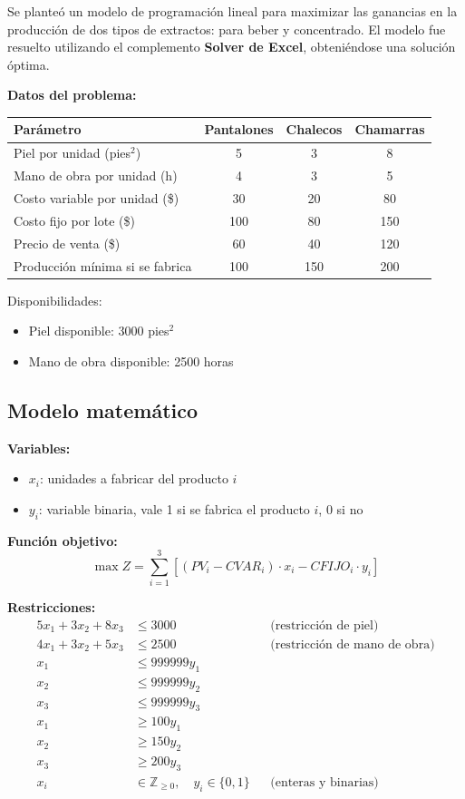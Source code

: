 \documentclass[12pt, a4paper, oneside]{book}
\theoremstyle{definition}
\begin{document}
Se planteó un modelo de programación lineal para maximizar las ganancias en la producción de dos tipos de extractos: para beber y concentrado. El modelo fue resuelto utilizando el complemento \textbf{Solver de Excel}, obteniéndose una solución óptima.

\textbf{Datos del problema:}

\begin{center}
\begin{tabular}{|l|c|c|c|}
\hline
\textbf{Parámetro} & \textbf{Pantalones} & \textbf{Chalecos} & \textbf{Chamarras} \\
\hline
Piel por unidad (pies$^2$) & 5 & 3 & 8 \\
Mano de obra por unidad (h) & 4 & 3 & 5 \\
Costo variable por unidad (\$) & 30 & 20 & 80 \\
Costo fijo por lote (\$) & 100 & 80 & 150 \\
Precio de venta (\$) & 60 & 40 & 120 \\
Producción mínima si se fabrica & 100 & 150 & 200 \\
\hline
\end{tabular}
\end{center}

Disponibilidades:
\begin{itemize}
    \item Piel disponible: 3000 pies$^2$
    \item Mano de obra disponible: 2500 horas
\end{itemize}

\subsection{Modelo matemático}

\textbf{Variables:}
\begin{itemize}
    \item $x_i$: unidades a fabricar del producto $i$
    \item $y_i$: variable binaria, vale 1 si se fabrica el producto $i$, 0 si no
\end{itemize}

\textbf{Función objetivo:}
\[
\max Z = \sum_{i=1}^{3} \left[ (PV_i - CVAR_i)\cdot x_i - CFIJO_i \cdot y_i \right]
\]

\textbf{Restricciones:}
\begin{align*}
5x_1 + 3x_2 + 8x_3 &\leq 3000 && \text{(restricción de piel)} \\
4x_1 + 3x_2 + 5x_3 &\leq 2500 && \text{(restricción de mano de obra)} \\
x_1 &\leq 999999 y_1 \\
x_2 &\leq 999999 y_2 \\
x_3 &\leq 999999 y_3 \\
x_1 &\geq 100 y_1 \\
x_2 &\geq 150 y_2 \\
x_3 &\geq 200 y_3 \\
x_i &\in \mathbb{Z}_{\geq 0},\quad y_i \in \{0,1\} && \text{(enteras y binarias)}
\end{align*}
\end{document}
